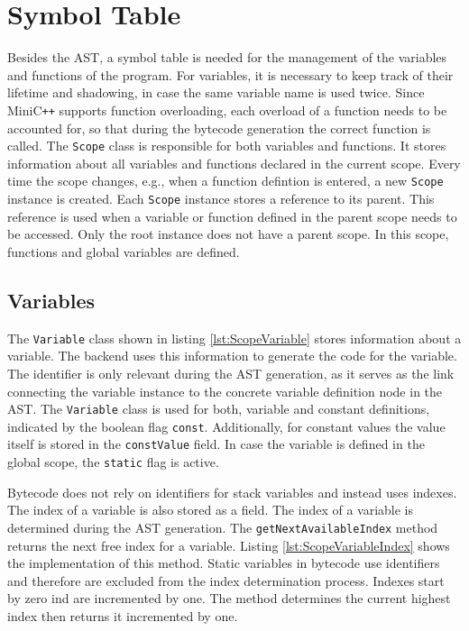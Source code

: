 
\section{Symbol Table}

Besides the AST, a symbol table is needed for the management of the variables and functions of the program. For variables, it is necessary to keep track of their lifetime and shadowing, in case the same variable name is used twice. Since MiniC\verb|++| supports function overloading, each overload of a function needs to be accounted for, so that during the bytecode generation the correct function is called. The \verb|Scope| class is responsible for both variables and functions. It stores information about all variables and functions declared in the current scope. Every time the scope changes, e.g., when a function defintion is entered, a new \verb|Scope| instance is created. Each \verb|Scope| instance stores a reference to its parent. This reference is used when a variable or function defined in the parent scope needs to be accessed. Only the root instance does not have a parent scope. In this scope, functions and global variables are defined.

\subsection{Variables}

The \verb|Variable| class shown in listing \ref{lst:ScopeVariable} stores information about a variable. The backend uses this information to generate the code for the variable. The identifier is only relevant during the AST generation, as it serves as the link connecting the variable instance to the concrete variable definition node in the AST. The \verb|Variable| class is used for both, variable and constant definitions, indicated by the boolean flag \verb|const|. Additionally, for constant values the value itself is stored in the \verb|constValue| field. In case the variable is defined in the global scope, the \verb|static| flag is active. 

Bytecode does not rely on identifiers for stack variables and instead uses indexes. The index of a variable is also stored as a field. The index of a variable is determined during the AST generation. The \verb|getNextAvailableIndex| method returns the next free index for a variable. Listing \ref{lst:ScopeVariableIndex} shows the implementation of this method. Static variables in bytecode use identifiers and therefore are excluded from the index determination process. Indexes start by zero ind are incremented by one. The method determines the current highest index then returns it incremented by one. 


